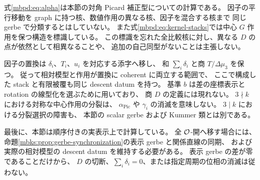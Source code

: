 \begin{remark}
\label{mbpd:rem:scope}
式\eqref{mbpd:eq:alpha}は本節の対角 Picard 補正型についての計算である。
因子の平行移動を graph に持つ核、数値作用の異なる核、因子を混合する核まで
同じ gerbe で分類するとはしていない。
また式\eqref{mbpd:eq:kernel-stacks}では中心 $G$ 作用を保つ構造を標識している。
この標識を忘れた全比較核に対し、異なる $D$ の点が依然として相異なることや、
追加の自己同型がないことは主張しない。

因子の置換は $\delta_i$、$T_i$、$u_i$ を対応する添字へ移し、
和 $\sum_i\delta_i$ と商 $T/\Delta\mu_3$ を保つ。
従って相対模型と作用が置換に coherent に両立する範囲で、
ここで構成した stack と有限被覆も同じ descent datum を持つ。
基準 $b$ は差の座標表示と rotation の線型化を選ぶために用いており、
商 $D$ の定義には現れない。
$3\nmid k$ における対称な中心作用の分裂は、
$\alpha_{\mathrm{Pic}}$ や $\gamma_i$ の消滅を意味しない。
$3\mid k$ における分裂選択の障害も、
本節の scalar gerbe および Kummer 類とは別である。

最後に、本節は順序付きの実表示上で計算している。
全 $\mathcal O$-開へ移す場合には、
命題\ref{mbks:prop:gerbe-synchronization}の表示 gerbe と関係直線の同期、
および実際の相対模型の descent datum を維持する必要がある。
表示 gerbe の差が零であることだけから、
$D$ の切断、$\sum_i\delta_i=0$、または指定周期の位相の消滅は従わない。
\end{remark}
